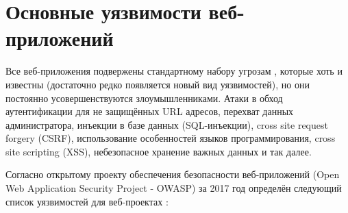 \section{Основные уязвимости веб-приложений} \label{ch1:majorVulnerabilities} 

Все веб-приложения подвержены стандартному набору угрозам \cite{wichers2017owasp, Securing91:online}, которые хоть и известны (достаточно редко появляется новый вид уязвимостей), но они постоянно усовершенствуются злоумышленниками. Атаки в обход аутентификации для не защищённых URL адресов, перехват данных администратора, инъекции в базе данных (SQL-инъекции), cross site request forgery (CSRF), использование особенностей языков программирования, cross site scripting (XSS), небезопасное хранение важных данных и так далее.


Согласно открытому проекту обеспечения безопасности веб-приложений (Open Web Application Security Project - OWASP) за 2017 год определён следующий список уязвимостей для веб-проектах \cite{wichers2017owasp}:
